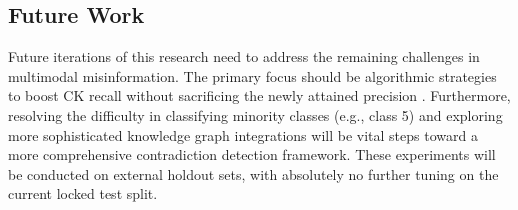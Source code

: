 \subsection{Future Work}
Future iterations of this research need to address the remaining challenges in multimodal misinformation. The primary focus should be algorithmic strategies to boost CK recall without sacrificing the newly attained precision \cite{ref48}. Furthermore, resolving the difficulty in classifying minority classes (e.g., class 5) \cite{ref49} and exploring more sophisticated knowledge graph integrations will be vital steps toward a more comprehensive contradiction detection framework. These experiments will be conducted on external holdout sets, with absolutely no further tuning on the current locked test split.
